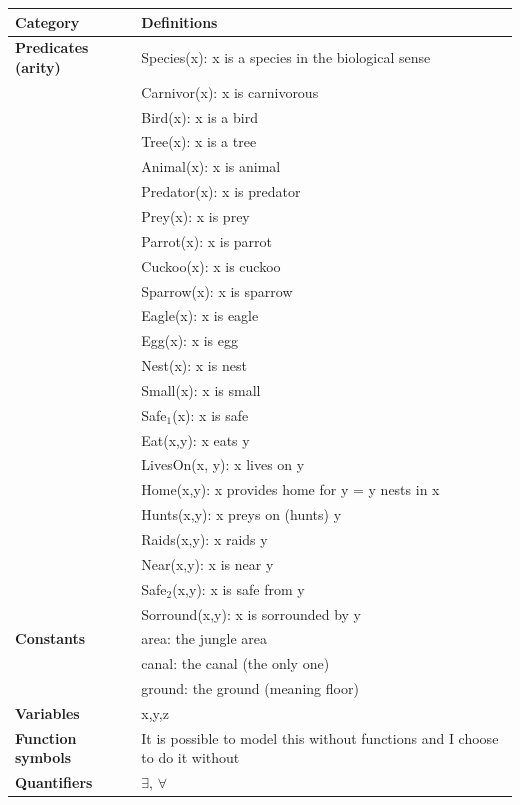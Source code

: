 \documentclass[11pt,a4paper]{article}
\newenvironment{solution}{%
	\begin{tcolorbox}[
		breakable,
		colback=green!4,
		colframe=green!50!black,
		fonttitle=\bfseries,
		title={ Solution},
		left=6pt, right=6pt, top=4pt, bottom=4pt
		]%
	}{%
	\end{tcolorbox}%
}
\begin{document}
\begin{solution}
\begin{center}
	\renewcommand{\arraystretch}{1.4}
	\begin{tabular}{>{\bfseries}p{3.5cm} p{9cm}}
		\toprule
		Category & Definitions \\
		\midrule
		Predicates (arity) 
		& Species(x): x is a species in the biological sense \\
		& Carnivor(x): x is carnivorous \\
		& Bird(x): x is a bird \\
		& Tree(x): x is a tree \\
		& Animal(x): x is animal \\
		& Predator(x): x is predator \\
		& Prey(x): x is prey \\
		& Parrot(x): x is parrot \\
		& Cuckoo(x): x is cuckoo \\
		& Sparrow(x): x is sparrow \\
		& Eagle(x): x is eagle \\
		& Egg(x): x is egg \\
		& Nest(x): x is nest \\
		
		& Small(x): x is small \\
		& Safe$_1$(x): x is safe \\
		
		& Eat(x,y): x eats y \\
		& LivesOn(x, y): x lives on y  \\
		& Home(x,y): x provides home for y = y nests in x \\ 
		& Hunts(x,y): x preys on (hunts) y \\
		& Raids(x,y): x raids y \\
		
		& Near(x,y): x is near y \\
		& Safe$_2$(x,y): x is safe from y \\
		& Sorround(x,y): x is sorrounded by y  \\
		
		Constants & area: the jungle area \\
		& canal: the canal (the only one)\\
		& ground: the ground (meaning floor) \\
		Variables & x,y,z  \\
		Function symbols 
		& It is possible to model this without functions and I choose to do it without \\
		Quantifiers & $\exists$, $\forall$ \\
		\bottomrule
	\end{tabular}
\end{center}
\end{solution}
\end{document}
